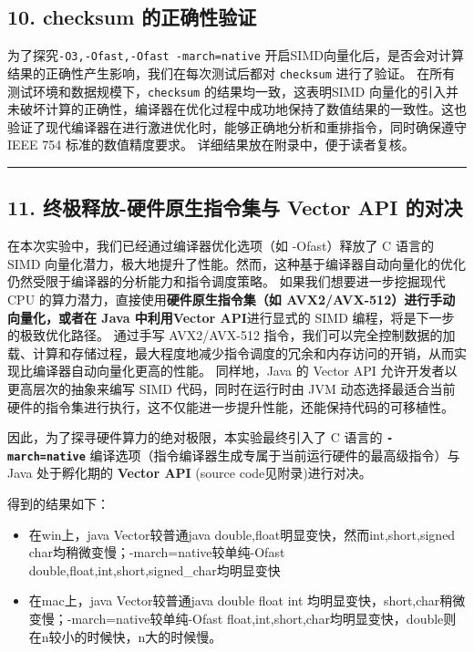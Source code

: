\documentclass[12pt,fontset=none]{ctexart}
\providecommand{\tightlist}{%
  \setlength{\itemsep}{0pt}\setlength{\parskip}{0pt}}
\begin{document}
\subsection{10. checksum
的正确性验证}\label{10-checksum-ux7684ux6b63ux786eux6027ux9a8cux8bc1}

为了探究\texttt{-O3,-Ofast,-Ofast\ -march=native}
开启SIMD向量化后，是否会对计算结果的正确性产生影响，我们在每次测试后都对
\texttt{checksum} 进行了验证。
在所有测试环境和数据规模下，\texttt{checksum} 的结果均一致，这表明SIMD
向量化的引入并未破坏计算的正确性，编译器在优化过程中成功地保持了数值结果的一致性。这也验证了现代编译器在进行激进优化时，能够正确地分析和重排指令，同时确保遵守
IEEE 754 标准的数值精度要求。 详细结果放在附录中，便于读者复核。

\begin{center}\rule{0.5\linewidth}{0.5pt}\end{center}

\subsection{11. 终极释放-硬件原生指令集与 Vector API
的对决}\label{11-ux7ec8ux6781ux91caux653e-ux786cux4ef6ux539fux751fux6307ux4ee4ux96c6ux4e0e-vector-api-ux7684ux5bf9ux51b3}

在本次实验中，我们已经通过编译器优化选项（如 -Ofast）释放了 C 语言的
SIMD
向量化潜力，极大地提升了性能。然而，这种基于编译器自动向量化的优化仍然受限于编译器的分析能力和指令调度策略。
如果我们想要进一步挖掘现代 CPU
的算力潜力，直接使用\textbf{硬件原生指令集（如
AVX2/AVX-512）\textbf{进行手动向量化，或者在 Java 中利用}Vector
API}进行显式的 SIMD 编程，将是下一步的极致优化路径。 通过手写
AVX2/AVX-512
指令，我们可以完全控制数据的加载、计算和存储过程，最大程度地减少指令调度的冗余和内存访问的开销，从而实现比编译器自动向量化更高的性能。
同样地，Java 的 Vector API 允许开发者以更高层次的抽象来编写 SIMD
代码，同时在运行时由 JVM
动态选择最适合当前硬件的指令集进行执行，这不仅能进一步提升性能，还能保持代码的可移植性。

因此，为了探寻硬件算力的绝对极限，本实验最终引入了 C 语言的
\textbf{\texttt{-march=native}}
编译选项（指令编译器生成专属于当前运行硬件的最高级指令）与 Java
处于孵化期的 \textbf{Vector API} (source code见附录)进行对决。

得到的结果如下：

\begin{itemize}
\tightlist
\item
  在win上，java Vector较普通java
  double,float明显变快，然而int,short,signed
  char均稍微变慢；-march=native较单纯-Ofast
  double,float,int,short,signed\_char均明显变快
\item
  在mac上，java Vector较普通java double float int
  均明显变快，short,char稍微变慢；-march=native较单纯-Ofast
  float,int,short,char均明显变快，double则在n较小的时候快，n大的时候慢。
\end{itemize}
\end{document}
